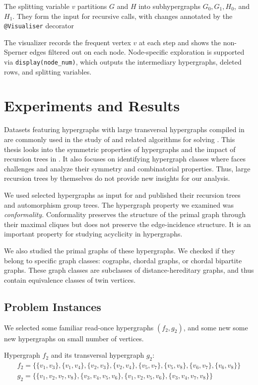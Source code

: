 The splitting variable $v$ partitions $G$ and $H$ into subhypergraphs $G_0,G_1,H_0$, and $H_1$. They form the input for recursive calls, with changes annotated by the \texttt{@Visualiser} decorator

The visualizer records the frequent vertex $v$ at each step and shows the non-Sperner edges filtered out on each node. Node-specific exploration is supported via \texttt{display(node\_num)}, which outputs the intermediary hypergraphs, deleted rows, and splitting variables.

\section{Experiments and Results}

Datasets featuring hypergraphs with large transversal hypergraphs compiled in \cite{Uno24} are commonly used in the study of \FKA{} and related algorithms for solving \TransHyp{} \cite{Tak08}. This thesis looks into the symmetric properties of hypergraphs and the impact of recursion trees in \FKA. It also focuses on identifying hypergraph classes where \FKA{} faces challenges and analyze their symmetry and combinatorial properties. Thus, large recursion trees by themselves do not provide new insights for our analysis.

We used selected hypergraphs as input for \FKA{} and published their recursion trees and automorphism group trees. The hypergraph property we examined was \emph{conformality.} Conformality preserves the structure of the primal graph through their maximal cliques but does not preserve the edge-incidence structure. It is an important property for studying acyclicity in hypergraphs.

We also studied the primal graphs of these hypergraphs. We checked if they belong to specific graph classes: cographs, chordal graphs, or chordal bipartite graphs. These graph classes are subclasses of distance-hereditary graphs, and thus contain equivalence classes of twin vertices.

\subsection{Problem Instances}

We selected some familiar read-once hypergraphs $(f_2,g_2)$, and some new some new hypergraphs on small number of vertices.

Hypergraph $f_2$ and its transversal hypergraph $g_2$:
\begin{gather*}
f_2=\{\{v_1,v_3\},\{v_1,v_4\},\{v_2,v_3\},\{v_2,v_4\},\{v_5,v_7\},\{v_5,v_8\},\{v_6,v_7\},\{v_6,v_8\}\}\\[4pt]
g_2=\{\{v_1,v_2,v_7,v_8\},\{v_3,v_4,v_5,v_6\},\{v_1,v_2,v_5,v_6\},\{v_3,v_4,v_7,v_8\}\}
\end{gather*}

